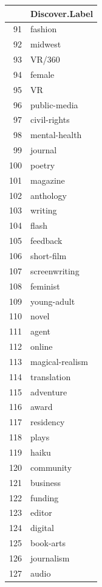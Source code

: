\documentclass[12pt]{report}   %
\begin{document}
\begin{figure}[h]
\begin{minipage}[h]{0.24\textwidth}
\begin{tabular}{rl}
  \hline
\end{tabular}
    \end{minipage}
\begin{minipage}[h]{0.24\textwidth}

\begin{tabular}{rl}
  \hline
 & Discover.Label \\ 
  \hline
  91 & fashion \\ 
  92 & midwest \\ 
  93 & VR/360 \\ 
  94 & female \\ 
  95 & VR \\ 
  96 & public-media \\ 
  97 & civil-rights \\ 
  98 & mental-health \\ 
  99 & journal \\ 
  100 & poetry \\ 
  101 & magazine \\ 
  102 & anthology \\ 
  103 & writing \\ 
  104 & flash \\ 
  105 & feedback \\ 
  106 & short-film \\ 
  107 & screenwriting \\ 
  108 & feminist \\ 
  109 & young-adult \\ 
  110 & novel \\ 
  111 & agent \\ 
  112 & online \\ 
  113 & magical-realism \\ 
  114 & translation \\ 
  115 & adventure \\ 
  116 & award \\ 
  117 & residency \\ 
  118 & plays \\ 
  119 & haiku \\ 
  120 & community \\ 
  121 & business \\ 
  122 & funding \\ 
  123 & editor \\ 
  124 & digital \\ 
  125 & book-arts \\ 
  126 & journalism \\ 
  127 & audio \\ 

\end{tabular}
\end{minipage}
\end{figure}
\end{document}
